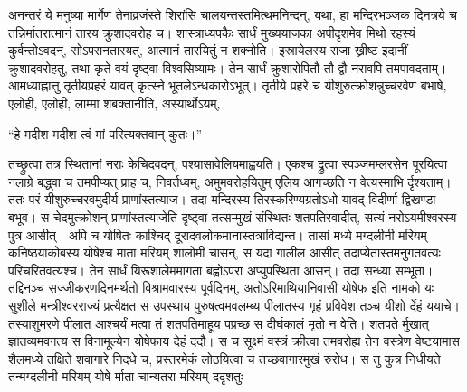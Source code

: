 \vakya अनन्तरं ये मनुष्या मार्गेण तेनाव्रजंस्ते शिरांसि चालयन्तस्तमित्थमनिन्दन्, यथा, हा मन्दिरभञ्जक दिनत्रये च तन्निर्मातरात्मानं तारय क्रुशादवरोह च।
\vakya शास्त्राध्यपकैः सार्धं मुख्ययाजका अपीदृशमेव मिथो रहस्यं कुर्वन्तोऽवदन्,
\vakya सोऽपरानतारयत्, आत्मानं तारयितुं न शक्नोति।
\vakya इस्रायेलस्य राजा ख्रीष्ट इदानीं क्रुशादवरोहतु, तथा कृते वयं दृष्ट्वा विश्वसिष्यामः। तेन सार्धं क्रुशारोपितौ तौ द्वौ नरावपि तमपावदताम्।
\vakya आमध्याह्नात्तु तृतीयप्रहरं यावत् कृत्स्ने भूतलेऽन्धकारोऽभूत्।
\vakya तृतीये प्रहरे च यीशुरुत्क्रोशन्नुच्चरवेण बभाषे, एलोही, एलोही, लाम्मा शबक्तानीति, अस्यार्थोऽयम्,
\begin{poem}
\startwithline “हे मदीश मदीश त्वं मां परित्यक्तवान् कुतः।”
\end{poem}
\vakya तच्छ्रुत्वा तत्र स्थितानां नराः केचिदवदन्, पश्यासावेलियमाह्वयति।
\vakya एकश्च द्रुत्वा स्पञ्जमम्लरसेन पूरयित्वा नलाग्रे बद्ध्वा च तमपीप्यत् प्राह च, निवर्तध्वम्, अमुमवरोहयितुम् एलिय आगच्छति न वेत्यस्माभि र्दृश्यताम्।
\vakya ततः परं यीशुरुच्चरवमुदीर्य प्राणांस्तत्याज। तदा मन्दिरस्य तिरस्करिण्यग्रतोऽधो यावद् विदीर्णा द्विखण्डा बभूव।
\vakya स चेदमुत्क्रोशन् प्राणांस्तत्याजेति दृष्ट्वा तत्सम्मुखं संस्थितः शतपतिरवादीत्,
\vakya सत्यं नरोऽयमीश्वरस्य पुत्र आसीत्।
\vakya अपि च योषितः काश्चिद् दूरादवलोकमानास्तत्राविद्यन्त।
\vakya तासां मध्ये मग्दलीनी मरियम् कनिष्ठयाकोबस्य योषेश्च माता मरियम् शालोमी चासन्, स यदा गालील आसीत् तदाप्येतास्तमनुगतवत्यः परिचरितवत्यश्च। तेन सार्धं यिरूशालेममागता बह्वोऽपरा अप्युपस्थिता आसन्।
\vakya तदा सन्ध्या सम्भूता। तद्दिनञ्च सज्जीकरणदिनमर्थतो विश्रामवारस्य पूर्वदिनम्,
\vakya अतोऽरिमाथियानिवासी योषेफ इति नामको यः सुशीले मन्त्रीश्वरराज्यं प्रत्यैक्षत स उपस्थाय पुरुषत्वमवलम्ब्य पीलातस्य गृहं प्रविवेश तञ्च यीशो र्देहं ययाचे।
\vakya तस्याशुमरणे पीलात आश्चर्यं मत्वा तं शतपतिमाहूय पप्रच्छ स दीर्घकालं मृतो न वेति।
\vakya शतपते र्मुखात् ज्ञातव्यमवगत्य स विनामूल्येन योषेफाय देहं ददौ।
\vakya स च सूक्ष्मं वस्त्रं क्रीत्वा तमवरोह्य तेन वस्त्रेण वेष्टयामास शैलमध्ये तक्षिते शवागारे निदधे च, प्रस्तरमेकं लोठयित्वा च तच्छवागारमुखं रुरोध।
\vakya स तु कुत्र निधीयते तन्मग्दलीनी मरियम् योषे र्माता चान्यतरा मरियम् ददृशतुः\eoc